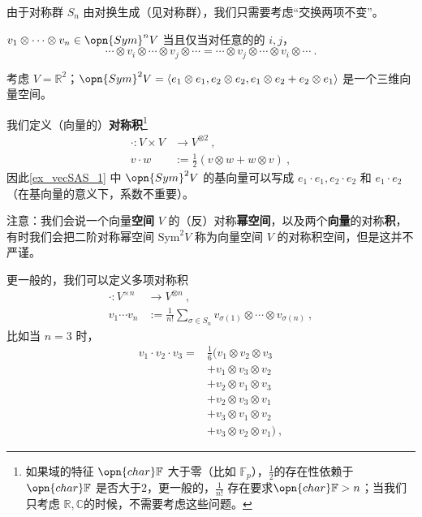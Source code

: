 由于对称群 $S_n$ 由对换生成（见对称群），我们只需要考虑“交换两项不变”。
\begin{theorem}{}
$v_1 \otimes \cdots \otimes v_n \in \opn{Sym}^n V$ 当且仅当对任意的的 $i, j$，
\begin{equation}
\cdots \otimes v_i \otimes \cdots \otimes v_j \otimes \cdots = \cdots \otimes v_j \otimes \cdots \otimes v_i \otimes \cdots~.
\end{equation}

\end{theorem}

\begin{example}{}\label{ex_vecSAS_1}
考虑 $V = \mathbb{R}^2$；$\opn{Sym}^2 V = \langle e_1 \otimes e_1, e_2 \otimes e_2, e_1 \otimes e_2 + e_2 \otimes e_1 \rangle$ 是一个三维向量空间。
\end{example}

我们定义（向量的）\textbf{对称积}\footnote{如果域的特征 $\opn{char} \mathbb{F}$ 大于零（比如 $\mathbb{F}_p$），$\frac{1}{2}$的存在性依赖于 $\opn{char} \mathbb{F}$ 是否大于$2$，更一般的，$\frac{1}{n!}$ 存在要求$\opn{char} \mathbb{F} > n$；当我们只考虑 $\mathbb{R}, \mathbb{C}$的时候，不需要考虑这些问题。}
\begin{equation}
\begin{aligned}
\cdot: V \times V &\to V^{\otimes 2}~, \\
v \cdot w &:= \frac12 (v \otimes w + w \otimes v)~,
\end{aligned}
\end{equation}
因此\autoref{ex_vecSAS_1} 中 $\opn{Sym}^2 V$ 的基向量可以写成 $e_1 \cdot e_1, e_2 \cdot e_2$ 和 $e_1 \cdot e_2$ （在基向量的意义下，系数不重要）。

注意：我们会说一个向量\textbf{空间} $V$ 的（反）对称\textbf{幂空间}，以及两个\textbf{向量}的对称\textbf{积}，有时我们会把二阶对称幂空间 $\text{Sym}^2 V$ 称为向量空间 $V$ 的对称积空间，但是这并不严谨。

更一般的，我们可以定义多项对称积
\begin{equation}
\begin{aligned}
\cdot: V^{\times n} &\to V^{\otimes n}~, \\
v_1 \cdots v_n &:= \frac{1}{n!} \sum_{\sigma \in S_n} v_{\sigma(1)} \otimes \cdots \otimes v_{\sigma(n)}~,
\end{aligned}
\end{equation}
比如当 $n = 3$ 时，
\begin{equation}
\begin{aligned}
v_1 \cdot v_2 \cdot v_3 = &\frac16 (v_1 \otimes v_2 \otimes v_3 \\
&+ v_1 \otimes v_3 \otimes v_2 \\
&+ v_2 \otimes v_1 \otimes v_3 \\
&+ v_2 \otimes v_3 \otimes v_1 \\
&+ v_3 \otimes v_1 \otimes v_2 \\
&+ v_3 \otimes v_2 \otimes v_1)~,
\end{aligned}
\end{equation}


